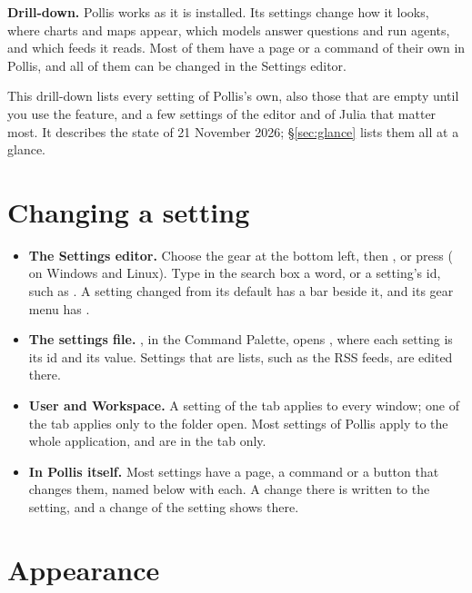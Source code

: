 \begin{nbox}
{\color{amber}\bfseries Drill-down.}\enspace
Pollis works as it is installed. Its settings change how it looks, where charts and maps appear, which models answer
questions and run agents, and which feeds it reads. Most of them have a page or a command of their own in Pollis, and
all of them can be changed in the Settings editor.

This drill-down lists every setting of Pollis's own, also those that are empty until you use the feature, and a few
settings of the editor and of Julia that matter most. It describes the state of 21 November 2026; \S\ref{sec:glance}
lists them all at a glance.
\end{nbox}

\tableofcontents

\section{Changing a setting}\label{sec:change}
\begin{itemize}
  \item \textbf{The Settings editor.} Choose the  gear at the bottom left, then , or press
     ( on Windows and Linux). Type in the search box a word, or a setting's id, such as
    . A setting changed from its default has a bar beside it, and its gear menu has
    .
  \item \textbf{The settings file.} , in the Command Palette, opens
    , where each setting is its id and its value. Settings that are lists, such as the RSS feeds,
    are edited there.
  \item \textbf{User and Workspace.} A setting of the  tab applies to every window; one of the
     tab applies only to the folder open. Most settings of Pollis apply to the whole application, and
    are in the  tab only.
  \item \textbf{In Pollis itself.} Most settings have a page, a command or a button that changes them, named below
    with each. A change there is written to the setting, and a change of the setting shows there.
\end{itemize}

\section{Appearance}\label{sec:appearance}

